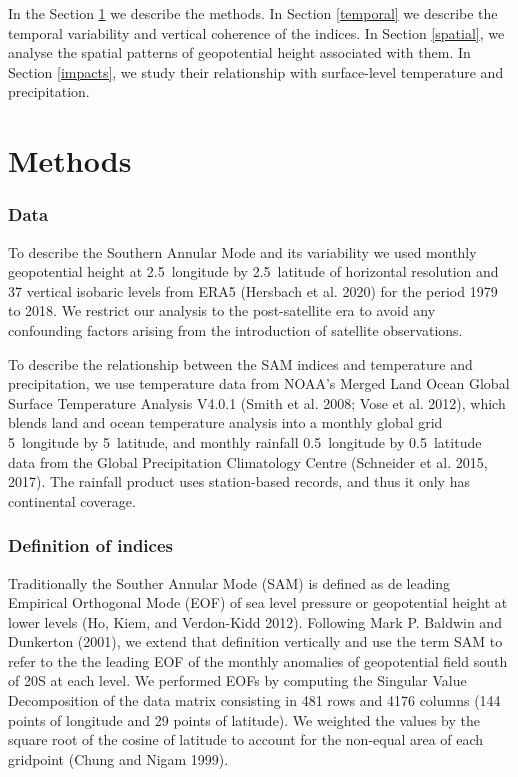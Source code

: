 \documentclass[smallextended]{svjour3}       %
\begin{document}
In the Section \ref{methods} we describe the methods. In Section \ref{temporal} we describe the temporal variability and vertical coherence of the indices. In Section \ref{spatial}, we analyse the spatial patterns of geopotential height associated with them. In Section \ref{impacts}, we study their relationship with surface-level temperature and precipitation.

\hypertarget{methods}{%
\section{Methods}\label{methods}}

\hypertarget{data}{%
\subsubsection{Data}\label{data}}

To describe the Southern Annular Mode and its variability we used monthly geopotential height at 2.5\degree~longitude by 2.5\degree~latitude of horizontal resolution and 37 vertical isobaric levels from ERA5 (Hersbach et al. 2020) for the period 1979 to 2018. We restrict our analysis to the post-satellite era to avoid any confounding factors arising from the introduction of satellite observations.

To describe the relationship between the SAM indices and temperature and precipitation, we use temperature data from NOAA's Merged Land Ocean Global Surface Temperature Analysis V4.0.1 (Smith et al. 2008; Vose et al. 2012), which blends land and ocean temperature analysis into a monthly global grid 5\degree~longitude by 5\degree~latitude, and monthly rainfall 0.5\degree~longitude by 0.5\degree~latitude data from the Global Precipitation Climatology Centre (Schneider et al. 2015, 2017). The rainfall product uses station-based records, and thus it only has continental coverage.

\hypertarget{definition-of-indices}{%
\subsubsection{Definition of indices}\label{definition-of-indices}}

Traditionally the Souther Annular Mode (SAM) is defined as de leading Empirical Orthogonal Mode (EOF) of sea level pressure or geopotential height at lower levels (Ho, Kiem, and Verdon-Kidd 2012). Following Mark P. Baldwin and Dunkerton (2001), we extend that definition vertically and use the term SAM to refer to the the leading EOF of the monthly anomalies of geopotential field south of 20\degree S at each level. We performed EOFs by computing the Singular Value Decomposition of the data matrix consisting in 481 rows and 4176 columns (144 points of longitude and 29 points of latitude). We weighted the values by the square root of the cosine of latitude to account for the non-equal area of each gridpoint (Chung and Nigam 1999).
\end{document}
